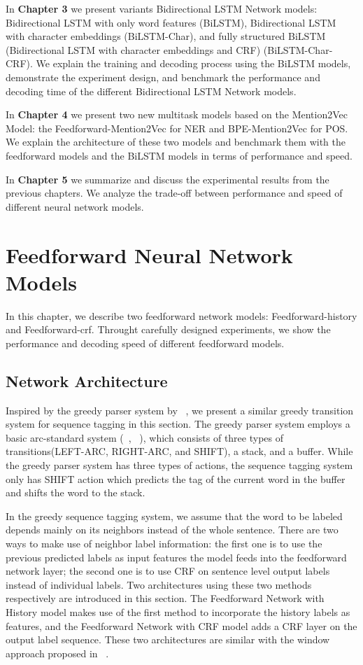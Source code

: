 \documentclass{sfuthesis}
\begin{document}
In \textbf{Chapter 3} we present variants Bidirectional LSTM Network models: Bidirectional LSTM with only word features (BiLSTM), Bidirectional LSTM with character embeddings (BiLSTM-Char), and fully structured BiLSTM (Bidirectional LSTM with character embeddings and CRF) (BiLSTM-Char-CRF). We explain the training and decoding process using the BiLSTM models, demonstrate the experiment design, and benchmark the performance and decoding time of the different Bidirectional LSTM Network models.

In \textbf{Chapter 4} we present two new multitask models based on the Mention2Vec Model: the Feedforward-Mention2Vec for NER and BPE-Mention2Vec for POS. We explain the architecture of these two models and benchmark them with the feedforward models and the BiLSTM models in terms of performance and speed.

In \textbf{Chapter 5} we summarize and discuss the experimental results from the previous chapters. We analyze the trade-off between performance and speed of different neural network models.


\chapter{Feedforward Neural Network Models}

In this chapter, we describe two feedforward network models: Feedforward-history and Feedforward-crf. Throught carefully designed experiments, we show the performance and decoding speed of different feedforward models.

\section{Network Architecture}
Inspired by the greedy parser system by ~\cite{chen2014fast}, we present a similar greedy transition system for sequence tagging in this section. The greedy parser system employs a basic arc-standard system (~\citeauthor{nivre2004deterministic}, ~\citeyear{nivre2004deterministic}), which consists of three types of transitions(LEFT-ARC, RIGHT-ARC, and SHIFT), a stack, and a buffer. While the greedy parser system has three types of actions, the sequence tagging system only has SHIFT action which predicts the tag of the current word in the buffer and shifts the word to the stack. 

In the greedy sequence tagging system, we assume that the word to be labeled depends mainly on its neighbors instead of the whole sentence. There are two ways to make use of neighbor label information: the first one is to use the previous predicted labels as input features the model feeds into the feedforward network layer; the second one is to use CRF on sentence level output labels instead of individual labels. Two architectures using these two methods respectively are introduced in this section. The Feedforward Network with History model makes use of the first method to incorporate the history labels as features, and the Feedforward Network with CRF model adds a CRF layer on the output label sequence. These two architectures are similar with the window approach proposed in ~\cite{collobert2011natural}.
\end{document}
